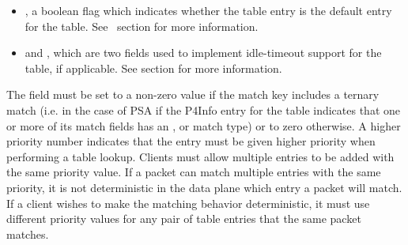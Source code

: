 \documentclass[11pt]{article}
\begin{document}
{\begin{itemize}
\item{}
, a boolean flag which indicates whether the table entry is
the default entry for the table. See~
section for more information.%

\item{}
 and , which are two fields used to
implement idle-timeout support for the table, if applicable. See
 section for more information.%
\end{itemize}%

\noindent{}The  field must be set to a non-zero value if the match key includes a
ternary match (i.e. in the case of PSA if the P4Info entry for the table
indicates that one or more of its match fields has an ,  or
 match
type) or to zero otherwise. A higher priority number indicates that the entry
must be given higher priority when performing a table lookup. Clients must allow
multiple entries to be added with the same priority value.  If a packet can
match multiple entries with the same priority, it is not deterministic in the
data plane which entry a packet will match.  If a client wishes to make the
matching behavior deterministic, it must use different priority values for any
pair of table entries that the same packet matches.%

}
\end{document}
